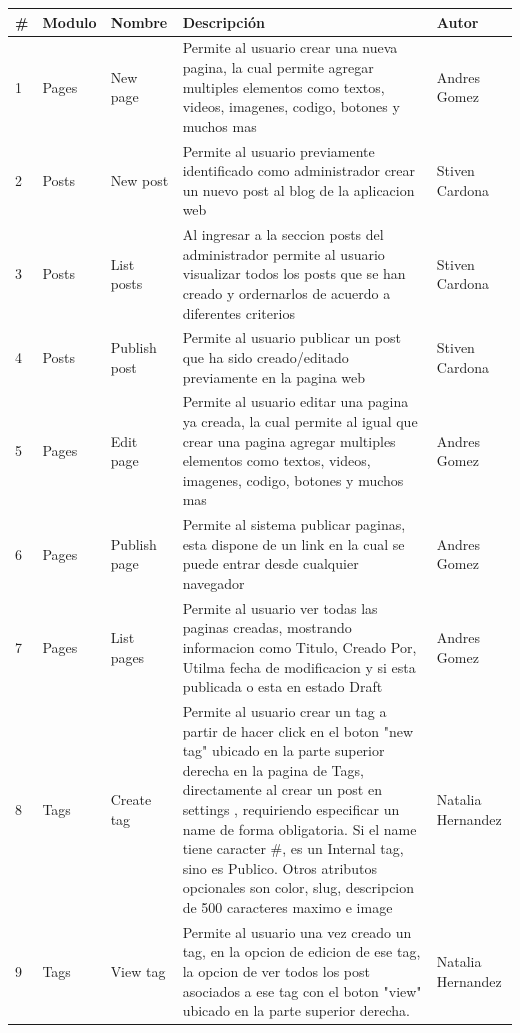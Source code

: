 \documentclass[report,12pt]{article}
\begin{document}
\begin{longtable}{|p{0.5cm}|p{1.5cm}|p{2cm}|p{6.5cm}|p{3cm}|}
    \hline
    \textbf{\#} & \textbf{Modulo} & \textbf{Nombre} & \textbf{Descripción} & \textbf{Autor} \\
    \hline
    1 & Pages & New page & Permite al usuario crear una nueva pagina, la cual permite agregar multiples elementos como textos, videos, imagenes, codigo, botones y muchos mas & Andres Gomez \\
    \hline
    2 & Posts & New post & Permite al usuario previamente identificado como administrador crear un nuevo post al blog de la aplicacion web & Stiven Cardona \\
    \hline
    3 & Posts & List posts & Al ingresar a la seccion posts del administrador permite al usuario visualizar todos los posts que se han creado y ordernarlos de acuerdo a diferentes criterios & Stiven Cardona \\
    \hline
    4 & Posts & Publish post & Permite al usuario publicar un post que ha sido creado/editado previamente en la pagina web & Stiven Cardona \\
    \hline
    5 & Pages & Edit page & Permite al usuario editar una pagina ya creada, la cual permite al igual que crear una pagina agregar multiples elementos como textos, videos, imagenes, codigo, botones y muchos mas & Andres Gomez \\
    \hline
    6 & Pages & Publish page & Permite al sistema publicar paginas, esta dispone de un link en la cual se puede entrar desde cualquier navegador & Andres Gomez \\
    \hline
    7 & Pages & List pages & Permite al usuario ver todas las paginas creadas, mostrando informacion como Titulo, Creado Por, Utilma fecha de modificacion y si esta publicada o esta en estado Draft & Andres Gomez \\
    \hline
    8 & Tags & Create tag & Permite al usuario crear un tag a partir de hacer click en el boton "new tag" ubicado en la parte superior derecha en la pagina de Tags, directamente al crear un post en settings , requiriendo especificar un name de forma obligatoria. Si el name tiene caracter \#, es un Internal tag, sino es Publico. Otros atributos opcionales son color, slug, descripcion de 500 caracteres maximo e image & Natalia Hernandez \\
    \hline
    9 & Tags & View tag & Permite al usuario una vez creado un tag, en la opcion de edicion de ese tag, la opcion de ver todos los post asociados a ese tag con el boton "view" ubicado en la parte superior derecha. & Natalia Hernandez \\

\end{longtable}
\end{document}
